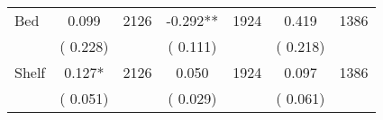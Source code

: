 \begin{tabular}{l*{6}{c}}
Bed        &              0.099      &       2126       &             -0.292**      &       1924       &              0.419      &       1386       \\
                       &       (       0.228)            &                               &       (       0.111)            &                               &       (       0.218)            &                               \\
Shelf        &              0.127*      &       2126       &              0.050      &       1924       &              0.097      &       1386       \\
                       &       (       0.051)            &                               &       (       0.029)            &                               &       (       0.061)            &                               \\
\hline \end{tabular}
